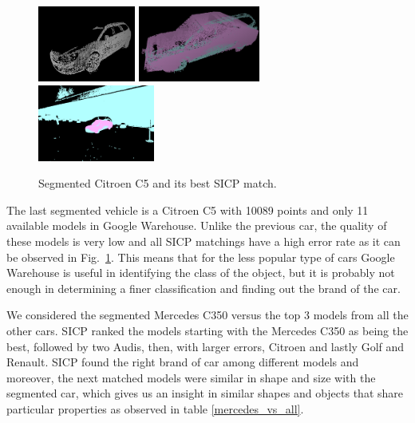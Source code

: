 \documentclass{llncs}
\begin{document}
  \begin{figure}[Ht]
    \centering
    \includegraphics[height=25mm]{chapter5_pictures/Citroen}
    \hfill
    \includegraphics[height=25mm]{chapter5_pictures/Citroen_matched}
    \hfill
    \includegraphics[height=25mm]{chapter5_pictures/Citroen_matched_scan}
    \caption{Segmented Citroen C5 and its best SICP match.}
    \label{citroen_trio}
  \end{figure}

The last segmented vehicle is a Citroen C5 with 10089 points and only
11 available models in Google Warehouse. Unlike the previous car, the
quality of these models is very low and all SICP matchings have a high
error rate as it can be observed in Fig.~\ref{citroen_trio}. This
means that for the less popular type of cars Google Warehouse is
useful in identifying the class of the object, but it is probably not
enough in determining a finer classification and finding out the brand
of the car.

We considered the segmented Mercedes C350 versus the top 3 models from
all the other cars. SICP ranked the models starting with the Mercedes
C350 as being the best, followed by two Audis, then, with larger
errors, Citroen and lastly Golf and Renault. SICP found the right
brand of car among different models and moreover, the next matched
models were similar in shape and size with the segmented car, which
gives us an insight in similar shapes and objects that share
particular properties as observed in table \ref{mercedes_vs_all}.
\end{document}
